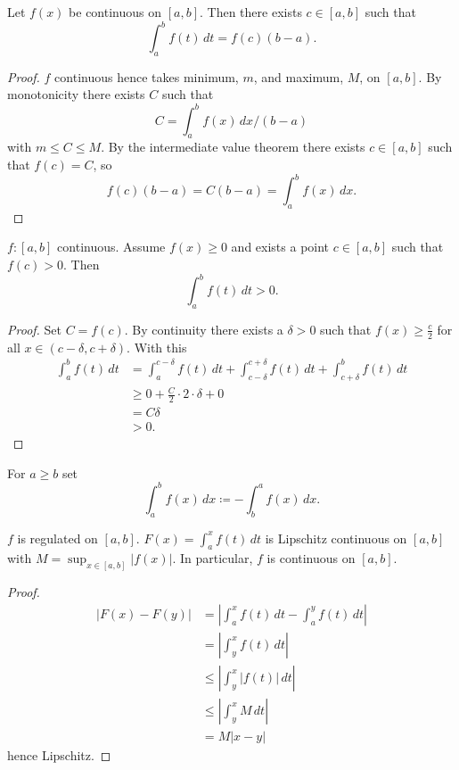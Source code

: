 \begin{theorem}\label{thm:intv_int_mvt}
    Let $f(x)$ be continuous on $[a, b]$.
    Then there exists $c \in [a, b]$ such that
    \[
    \int_{a}^{b}f(t)\,dt = f(c)(b - a).
    \]
\end{theorem}
\begin{proof}
    $f$ continuous hence takes minimum,
    $m$,
    and maximum,
    $M$,
    on $[a, b]$.
    By monotonicity there exists $C$ such that
    \[
    C = \int_{a}^{b}f(x)\,dx / (b - a)
    \]
    with $m \leq C \leq M$.
    By the intermediate value theorem there exists $c \in [a, b]$ such that $f(c) = C$,
    so
    \[
    f(c)(b - a) = C(b - a) = \int_{a}^{b}f(x)\,dx.
    \]
\end{proof}

\begin{theorem}\label{thm:pos_of_int}
    $f : [a, b]$ continuous.
    Assume $f(x) \geq 0$ and exists a point $c \in [a, b]$ such that $f(c) > 0$.
    Then
    \[
    \int_{a}^{b}f(t)\,dt > 0.
    \]
\end{theorem}
\begin{proof}
    Set $C = f(c)$.
    By continuity there exists a $\delta > 0$ such that $f(x) \geq \frac{c}{2}$ for all $x \in (c - \delta, c + \delta)$.
    With this
    \begin{align*}
        \int_{a}^{b}f(t)\,dt &= \int_{a}^{c - \delta}f(t)\,dt + \int_{c - \delta}^{c + \delta}f(t)\,dt + \int_{c + \delta}^{b}f(t)\,dt \\
        &\geq 0 + \frac{C}{2}\cdot 2\cdot \delta + 0 \\
        &= C\delta \\
        &> 0.
    \end{align*}
\end{proof}

\begin{definition}\label{def:swap_int_bounds}
    For $a \geq b$ set
    \[
    \int_{a}^{b}f(x)\,dx \coloneqq -\int_{b}^{a}f(x)\,dx.
    \]
\end{definition}

\begin{proposition}\label{prop:reg_lip_then_cont}
    $f$ is regulated on $[a, b]$.
    $F(x) = \int_{a}^{x}f(t)\,dt$ is Lipschitz continuous on $[a, b]$ with $M = \sup_{x \in [a, b]}|f(x)|$.
    In particular,
    $f$ is continuous on $[a, b]$.
\end{proposition}
\begin{proof}
    \begin{align*}
        |F(x) - F(y)| &= \left|\int_{a}^{x}f(t)\,dt - \int_{a}^{y}f(t)\,dt\right| \\
        &= \left|\int_{y}^{x}f(t)\,dt\right| \\
        &\leq \left|\int_{y}^{x}|f(t)|\,dt\right| \\
        &\leq \left|\int_{y}^{x}M\,dt\right| \\
        &= M|x - y|
    \end{align*}
    hence Lipschitz.
\end{proof}

